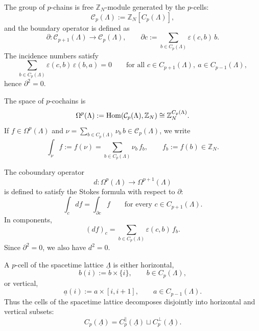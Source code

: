 The group of \(p\)-chains is free $\mathbb Z_N$-module generated by the $p$-cells:
\begin{equation}
	\mathcal C_p(\Lambda):=\mathbb Z_N[C_p(\Lambda)],
	\label{eq:chain-group}
\end{equation}
and the boundary operator is defined as
\begin{equation}
	\partial:\mathcal C_{p+1}(\Lambda)\to \mathcal C_p(\Lambda),
	\qquad
	\partial c:=\sum_{b\in C_p(\Lambda)}\varepsilon(c,b)\,b.
	\label{eq:boundary}
\end{equation}
The incidence numbers satisfy
\begin{equation}
	\sum_{b\in C_p(\Lambda)}\varepsilon(c,b)\,\varepsilon(b,a)=0
	\qquad
	\text{for all } c\in C_{p+1}(\Lambda),\ a\in C_{p-1}(\Lambda),
	\label{eq:incidence-identity}
\end{equation}
hence \(\partial^2=0\).

The space of \(p\)-cochains is
\begin{equation}
	\Omega^p(\Lambda):=\mathrm{Hom}(\mathcal C_p(\Lambda),\mathbb Z_N)
	\cong \mathbb Z_N^{C_p(\Lambda)}.
	\label{eq:cochain-group}
\end{equation}
If \(f\in \Omega^p(\Lambda)\) and $\nu=\sum_{b\in C_p(\Lambda)}\nu_b\,b\in \mathcal C_p(\Lambda)$,
we write
\begin{equation}
	\int_\nu f:=f(\nu)=\sum_{b\in C_p(\Lambda)}\nu_b\,f_b,
	\qquad
	f_b:=f(b)\in \mathbb Z_N.
	\label{eq:pairing}
\end{equation}

The coboundary operator
\begin{equation}
	d:\Omega^p(\Lambda)\to \Omega^{p+1}(\Lambda)
\end{equation}
is defined to satisfy the Stokes formula with respect to \(\partial\):
\begin{equation}
	\int_c df=\int_{\partial c} f
	\qquad
	\text{for every } c\in C_{p+1}(\Lambda).
	\label{eq:d-def}
\end{equation}
In components,
\begin{equation}
	(df)_c=\sum_{b\in C_p(\Lambda)}\varepsilon(c,b)\,f_b.
	\label{eq:d-components}
\end{equation}
Since \(\partial^2=0\), we also have \(d^2=0\).

A \(p\)-cell of the spacetime lattice \(\underline\Lambda\) is either horizontal,
\begin{equation}
	b(i):=b\times\{i\},
	\qquad
	b\in C_p(\Lambda),
	\label{eq:horizontalCell}
\end{equation}
or vertical,
\begin{equation}
	\underline a(i):=a\times[i,i+1],
	\qquad
	a\in C_{p-1}(\Lambda).
	\label{eq:verticalCell}
\end{equation}
Thus the cells of the spacetime lattice decomposes disjointly into horizontal and vertical subsets:
\begin{equation}
	C_p(\underline\Lambda)
	=
	C_p^{\parallel}(\underline\Lambda) \sqcup C_p^{\perp}(\underline\Lambda).
\end{equation}


